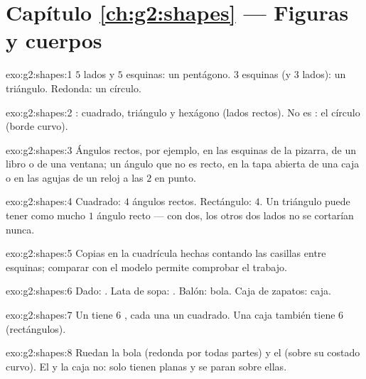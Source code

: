 \section*{Capítulo \ref{ch:g2:shapes} --- Figuras y cuerpos}

\begin{solution}{exo:g2:shapes:1}
$5$ lados y $5$ esquinas: un pentágono. $3$ esquinas (y $3$ lados): un
triángulo. Redonda: un círculo.
\end{solution}

\begin{solution}{exo:g2:shapes:2}
: cuadrado, triángulo y hexágono (lados rectos). No es
: el círculo (borde curvo).
\end{solution}

\begin{solution}{exo:g2:shapes:3}
Ángulos rectos, por ejemplo, en las esquinas de la pizarra, de un libro o de una
ventana; un ángulo que no es recto, en la tapa abierta de una caja o en las agujas
de un reloj a las $2$ en punto.
\end{solution}

\begin{solution}{exo:g2:shapes:4}
Cuadrado: $4$ ángulos rectos. Rectángulo: $4$. Un triángulo puede tener
como mucho $1$ ángulo recto --- con dos, los otros dos lados no se
cortarían nunca.
\end{solution}

\begin{solution}{exo:g2:shapes:5}
Copias en la cuadrícula hechas contando las casillas entre esquinas; comparar
con el modelo permite comprobar el trabajo.
\end{solution}

\begin{solution}{exo:g2:shapes:6}
Dado: . Lata de sopa: . Balón: bola. Caja de zapatos: caja.
\end{solution}

\begin{solution}{exo:g2:shapes:7}
Un  tiene $6$ , cada una un cuadrado. Una caja también tiene $6$ 
(rectángulos).
\end{solution}

\begin{solution}{exo:g2:shapes:8}
Ruedan la bola (redonda por todas partes) y el  (sobre su
costado curvo). El  y la caja no: solo tienen 
planas y se paran sobre ellas.
\end{solution}

